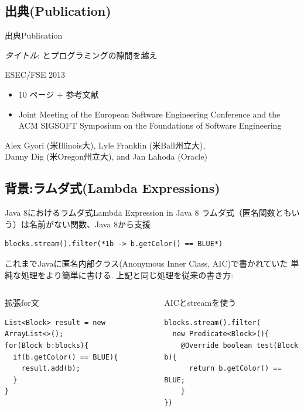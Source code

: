 \subsection{出典(Publication)}
\begin{frame}{出典}{Publication}

\emph{タイトル}: とプログラミングの隙間を越え

ESEC/FSE 2013
\begin{itemize}
\item 10 ページ + 参考文献
\item {\small Joint Meeting of
the European Software Engineering Conference and
the ACM SIGSOFT Symposium
on the Foundations of Software Engineering}
\end{itemize}
Alex Gyori (米Illinois大), Lyle Franklin (米Ball州立大),\\
{\small Danny Dig (米Oregon州立大), and Jan Lahoda (Oracle)}
\end{frame}
\subsection{背景:ラムダ式(Lambda Expressions)}
\begin{frame}[fragile]{Java 8におけるラムダ式}{Lambda Expression in Java 8}
ラムダ式（匿名関数ともいう）は名前がない関数、Java 8から支援
\begin{lstlisting}[moredelim={**[is][{\btHL}]{*1}{*}}]
blocks.stream().filter(*1b -> b.getColor() == BLUE*)
\end{lstlisting}
これまでJavaに匿名内部クラス(Anonymous Inner Class, AIC)で書かれていた
単純な処理をより簡単に書ける.
\pause
上記と同じ処理を従来の書き方:
\begin{columns}
\begin{column}{0.5\textwidth}
\begin{block}{拡張for文}
\begin{lstlisting}
List<Block> result = new ArrayList<>();
for(Block b:blocks){
  if(b.getColor() == BLUE){
    result.add(b);
  }
}
\end{lstlisting}
\end{block}
\end{column}
\begin{column}{0.47\textwidth}
\begin{block}{AICとstreamを使う}
\begin{lstlisting}
blocks.stream().filter(
  new Predicate<Block>(){
    @Override boolean test(Block b){
      return b.getColor() == BLUE;
    }
})
\end{lstlisting}
\end{block}
\end{column}
\end{columns}
\end{frame}

